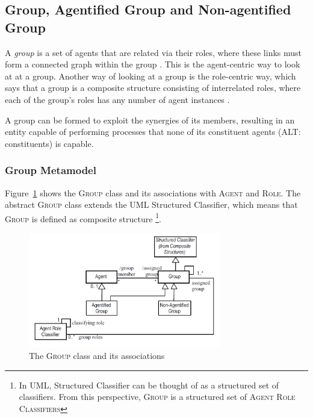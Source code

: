 \subsection{Group, Agentified Group and Non-agentified Group}

A \textit{group} is a set of agents that are related via their roles, where these links must form
a connected graph within the group \cite{Odell05}.
This is the agent-centric way to look at at a group.
Another way of looking at a group is the role-centric way, which says that a group is a composite structure consisting of interrelated roles, where each of the group's roles has any number of agent instances \cite{Odell05}.

A group can be formed to exploit the synergies of its members, resulting in an entity capable of performing processes that none of its constituent agents (ALT: constituents) is capable.

\subsubsection*{Group Metamodel}

Figure~\ref{figure:onp-group} shows the \textsc{Group} class and its associations with \textsc{Agent} and \textsc{Role}.
The abstract \textsc{Group} class extends the UML Structured Classifier, which means that \textsc{Group} is defined as composite structure \footnote{In UML, Structured Classifier can be thought of as a structured set of classifiers. From this perspective, \textsc{Group} is a structured set of \textsc{Agent Role Classifiers}}.

\begin{figure}[ht]
	\centering
	\includegraphics[width=0.75\textwidth]{images/onp/group.png}
	\caption{The \textsc{Group} class and its associations}
	\label{figure:onp-group}
\end{figure}

